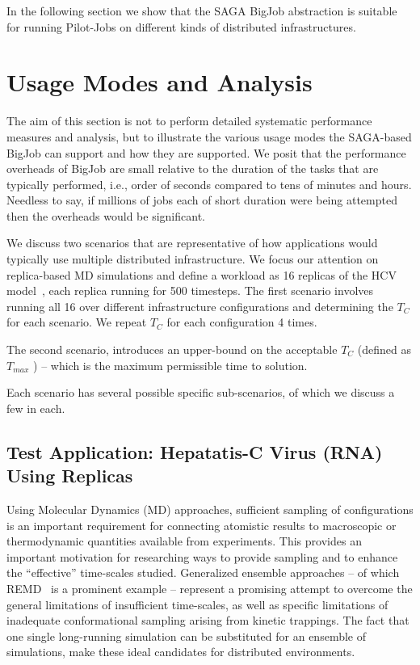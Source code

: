 \documentclass[conference,final]{IEEEtran}
\newcommand{\numrep}{16 }
\newcommand{\samplenum}{4 }
\newcommand{\tmax}{$T_{max}$ }
\newcommand{\tc}{$T_{C}$ }
\begin{document}
In the following section we show that the SAGA BigJob abstraction is
suitable for running Pilot-Jobs on different kinds of distributed
infrastructures.

\section{Usage Modes and Analysis}

The aim of this section is not to perform detailed systematic
performance measures and analysis, but to illustrate the various usage
modes the SAGA-based BigJob can support and how they are supported. We
posit that the performance overheads of BigJob are small relative to
the duration of the tasks that are typically performed, i.e., order of
seconds compared to tens of minutes and hours.  Needless to say, if
millions of jobs each of short duration were being attempted then the
overheads would be significant.

We discuss two scenarios that are representative of how applications
would typically use multiple distributed infrastructure. We focus our
attention on replica-based MD simulations and define a workload as
\numrep replicas of the HCV model~\cite{}, each replica running for
500 timesteps.  The first scenario involves running all \numrep over
different infrastructure configurations and determining the \tc for
each scenario. We repeat \tc for each configuration \samplenum times.

The second scenario, introduces an upper-bound on the acceptable \tc
(defined as \tmax) -- which is the maximum permissible time to
solution.

Each scenario has several possible specific sub-scenarios, of which we
discuss a few in each.

\subsection{Test Application: Hepatatis-C Virus (RNA) Using
  Replicas}

Using Molecular Dynamics (MD) approaches, sufficient sampling of
configurations is an important requirement for connecting atomistic
results to macroscopic or thermodynamic quantities available from
experiments. This provides an important motivation for researching
ways to provide sampling and to enhance the ``effective'' time-scales
studied.  Generalized ensemble approaches -- of which
REMD~\cite{Sugita:1999rm} is a prominent example -- represent a
promising attempt to overcome the general limitations of insufficient
time-scales, as well as specific limitations of inadequate
conformational sampling arising from kinetic trappings.  The fact that
one single long-running simulation can be substituted for an ensemble
of simulations, make these ideal candidates for distributed
environments.
\end{document}
